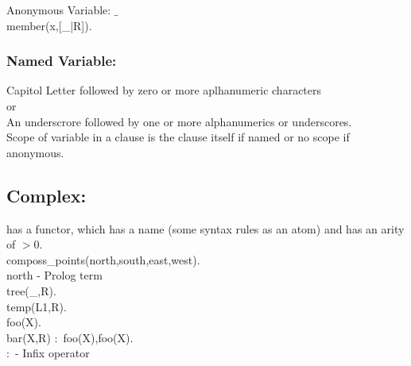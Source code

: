 \documentclass[a4paper,12pt]{article}
\begin{document}
Anonymous Variable: $\_$ \\

member(x,[_|R]). \\

\subsubsection{Named Variable:}

Capitol Letter followed by zero or more aplhanumeric characters \\

or \\

An underscrore followed by one or more alphanumerics or underscores. \\


Scope of variable in a clause is the clause itself if named or no scope if anonymous.

\subsection{Complex:}

has a functor, which has a name (some syntax rules as an atom) and has an arity of $\gt 0$. \\

composs_points(north,south,east,west). \\

north - Prolog term \\

tree(_,R). \\

temp(L1,R). \\

foo(X). \\

bar(X,R) $ : $ foo(X),foo(X). \\

$ : $ - Infix operator \\
\end{document}
